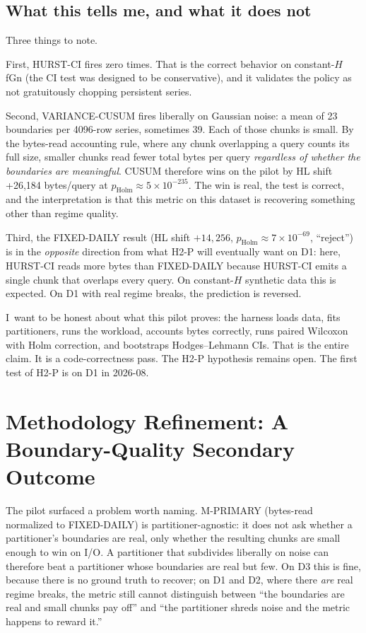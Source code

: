\documentclass[11pt]{article}
\begin{document}
\subsection{What this tells me, and what it does not}

Three things to note.

First, HURST-CI fires zero times. That is the correct behavior on constant-$H$ fGn (the CI test was designed to be conservative), and it validates the policy as not gratuitously chopping persistent series.

Second, VARIANCE-CUSUM fires liberally on Gaussian noise: a mean of 23 boundaries per 4096-row series, sometimes 39. Each of those chunks is small. By the bytes-read accounting rule, where any chunk overlapping a query counts its full size, smaller chunks read fewer total bytes per query \emph{regardless of whether the boundaries are meaningful}. CUSUM therefore wins on the pilot by HL shift +26{,}184 bytes/query at $p_{\mathrm{Holm}}\approx 5\times10^{-235}$. The win is real, the test is correct, and the interpretation is that this metric on this dataset is recovering something other than regime quality.

Third, the FIXED-DAILY result (HL shift $+14{,}256$, $p_{\mathrm{Holm}}\approx 7\times 10^{-69}$, ``reject'') is in the \emph{opposite} direction from what H2-P will eventually want on D1: here, HURST-CI reads more bytes than FIXED-DAILY because HURST-CI emits a single chunk that overlaps every query. On constant-$H$ synthetic data this is expected. On D1 with real regime breaks, the prediction is reversed.

I~want to be honest about what this pilot proves: the harness loads data, fits partitioners, runs the workload, accounts bytes correctly, runs paired Wilcoxon with Holm correction, and bootstraps Hodges--Lehmann CIs. That is the entire claim. It is a code-correctness pass. The H2-P hypothesis remains open. The first test of H2-P is on D1 in 2026-08.

\section{Methodology Refinement: A Boundary-Quality Secondary Outcome}
\label{sec:amendment}

The pilot surfaced a problem worth naming. M-PRIMARY (bytes-read normalized to FIXED-DAILY) is partitioner-agnostic: it does not ask whether a partitioner's boundaries are real, only whether the resulting chunks are small enough to win on I/O. A partitioner that subdivides liberally on noise can therefore beat a partitioner whose boundaries are real but few. On D3 this is fine, because there is no ground truth to recover; on D1 and D2, where there \emph{are} real regime breaks, the metric still cannot distinguish between ``the boundaries are real and small chunks pay off'' and ``the partitioner shreds noise and the metric happens to reward it.''
\end{document}

